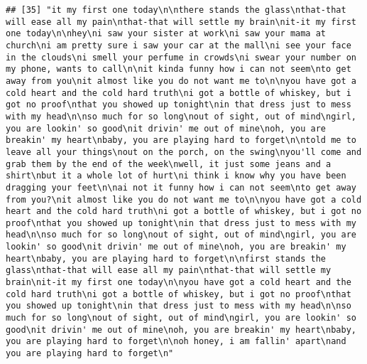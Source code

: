 \documentclass[]{article}
\begin{document}
\begin{verbatim}
## [35] "it my first one today\n\nthere stands the glass\nthat-that will ease all my pain\nthat-that will settle my brain\nit-it my first one today\n\nhey\ni saw your sister at work\ni saw your mama at church\ni am pretty sure i saw your car at the mall\ni see your face in the clouds\ni smell your perfume in crowds\ni swear your number on my phone, wants to call\n\nit kinda funny how i can not seem\nto get away from you\nit almost like you do not want me to\n\nyou have got a cold heart and the cold hard truth\ni got a bottle of whiskey, but i got no proof\nthat you showed up tonight\nin that dress just to mess with my head\n\nso much for so long\nout of sight, out of mind\ngirl, you are lookin' so good\nit drivin' me out of mine\noh, you are breakin' my heart\nbaby, you are playing hard to forget\n\ntold me to leave all your things\nout on the porch, on the swing\nyou'll come and grab them by the end of the week\nwell, it just some jeans and a shirt\nbut it a whole lot of hurt\ni think i know why you have been dragging your feet\n\nai not it funny how i can not seem\nto get away from you?\nit almost like you do not want me to\n\nyou have got a cold heart and the cold hard truth\ni got a bottle of whiskey, but i got no proof\nthat you showed up tonight\nin that dress just to mess with my head\n\nso much for so long\nout of sight, out of mind\ngirl, you are lookin' so good\nit drivin' me out of mine\noh, you are breakin' my heart\nbaby, you are playing hard to forget\n\nfirst stands the glass\nthat-that will ease all my pain\nthat-that will settle my brain\nit-it my first one today\n\nyou have got a cold heart and the cold hard truth\ni got a bottle of whiskey, but i got no proof\nthat you showed up tonight\nin that dress just to mess with my head\n\nso much for so long\nout of sight, out of mind\ngirl, you are lookin' so good\nit drivin' me out of mine\noh, you are breakin' my heart\nbaby, you are playing hard to forget\n\noh honey, i am fallin' apart\nand you are playing hard to forget\n"                                                                                                                                                                                                                                                                                                                                                                                                                                                                                                                                                                                                                                                                                                                                                                                                                                                                                    

\end{verbatim}
\end{document}
